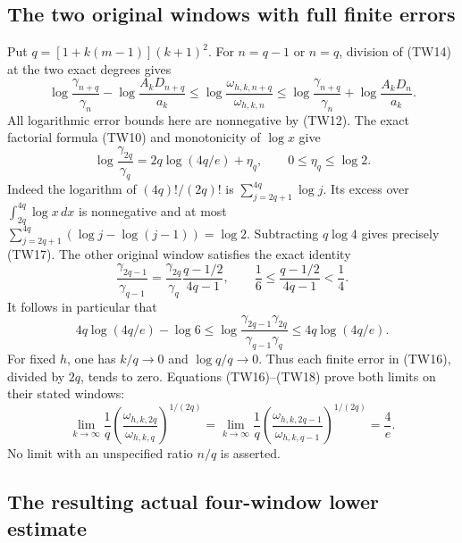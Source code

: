 \documentclass[11pt,a4paper]{article}
\begin{document}
\subsection{The two original windows with full finite errors}

Put $q=[1+k(m-1)](k+1)^2$.  For $n=q-1$ or $n=q$, division of
(TW14) at the two exact degrees gives
\[
 \log\frac{\gamma_{n+q}}{\gamma_n}
       -\log\frac{A_kD_{n+q}}{a_k}
 \leq\log\frac{\omega_{h,k,n+q}}{\omega_{h,k,n}}
 \leq\log\frac{\gamma_{n+q}}{\gamma_n}
       +\log\frac{A_kD_n}{a_k}.
 \tag{TW16}
\]
All logarithmic error bounds here are nonnegative by (TW12).
The exact factorial formula (TW10) and monotonicity of $\log x$ give
\[
 \log\frac{\gamma_{2q}}{\gamma_q}
 =2q\log(4q/e)+\eta_q,\qquad 0\leq\eta_q\leq\log2.
 \tag{TW17}
\]
Indeed the logarithm of $(4q)!/(2q)!$ is
$\sum_{j=2q+1}^{4q}\log j$.  Its excess over
$\int_{2q}^{4q}\log x\,dx$ is nonnegative and at most
$\sum_{j=2q+1}^{4q}(\log j-\log(j-1))=\log2$.
Subtracting $q\log4$ gives precisely (TW17).
The other original window satisfies the exact identity
\[
 \frac{\gamma_{2q-1}}{\gamma_{q-1}}
 =\frac{\gamma_{2q}}{\gamma_q}\frac{q-1/2}{4q-1},
 \qquad \frac16\leq\frac{q-1/2}{4q-1}<\frac14.
\]
It follows in particular that
\[
 4q\log(4q/e)-\log6
 \leq\log\frac{\gamma_{2q-1}\gamma_{2q}}
                    {\gamma_{q-1}\gamma_q}
 \leq4q\log(4q/e).
 \tag{TW18}
\]
For fixed $h$, one has $k/q\to0$ and $\log q/q\to0$.
Thus each finite error in (TW16), divided by $2q$, tends to zero.
Equations (TW16)--(TW18) prove both limits on their stated windows:
\[
 \boxed{
 \lim_{k\to\infty}\frac1q
 \left(\frac{\omega_{h,k,2q}}{\omega_{h,k,q}}\right)^{1/(2q)}
 =\lim_{k\to\infty}\frac1q
 \left(\frac{\omega_{h,k,2q-1}}{\omega_{h,k,q-1}}\right)^{1/(2q)}
 =\frac4e.}\tag{TW19}
\]
No limit with an unspecified ratio $n/q$ is asserted.

\subsection{The resulting actual four-window lower estimate}
\end{document}
